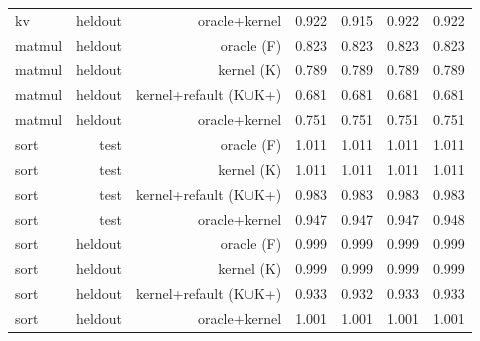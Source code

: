 \begin{tabular}{lrrrrrr}
kv & heldout & oracle{+}kernel & 0.922 & 0.915 & 0.922 & 0.922 \\
matmul & heldout & oracle (F) & 0.823 & 0.823 & 0.823 & 0.823 \\
matmul & heldout & kernel (K) & 0.789 & 0.789 & 0.789 & 0.789 \\
matmul & heldout & kernel{+}refault (K$\cup$K{+}) & 0.681 & 0.681 & 0.681 & 0.681 \\
matmul & heldout & oracle{+}kernel & 0.751 & 0.751 & 0.751 & 0.751 \\
sort & test & oracle (F) & 1.011 & 1.011 & 1.011 & 1.011 \\
sort & test & kernel (K) & 1.011 & 1.011 & 1.011 & 1.011 \\
sort & test & kernel{+}refault (K$\cup$K{+}) & 0.983 & 0.983 & 0.983 & 0.983 \\
sort & test & oracle{+}kernel & 0.947 & 0.947 & 0.947 & 0.948 \\
sort & heldout & oracle (F) & 0.999 & 0.999 & 0.999 & 0.999 \\
sort & heldout & kernel (K) & 0.999 & 0.999 & 0.999 & 0.999 \\
sort & heldout & kernel{+}refault (K$\cup$K{+}) & 0.933 & 0.932 & 0.933 & 0.933 \\
sort & heldout & oracle{+}kernel & 1.001 & 1.001 & 1.001 & 1.001 \\
\bottomrule
\end{tabular}
